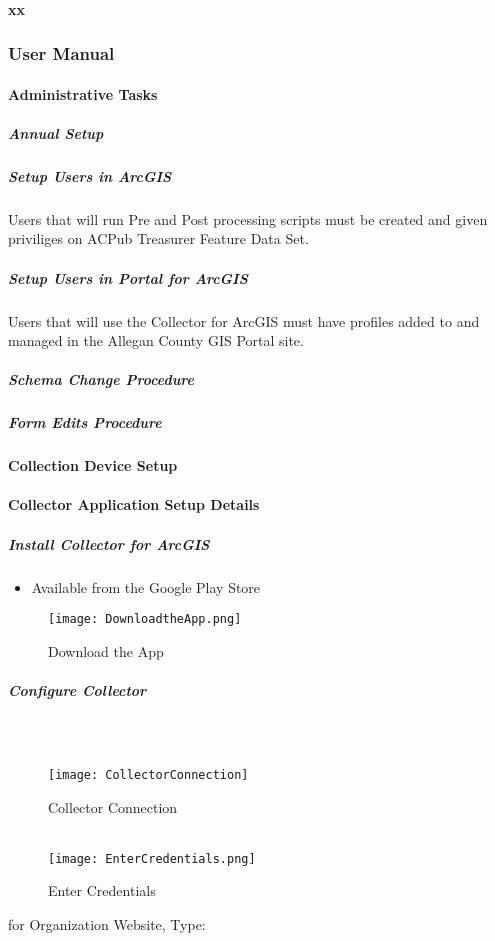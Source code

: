 \documentclass[class=article , crop=false, titlepage, twoside, multi={itemize, figure, verbatim}, float=false]{standalone}
\begin{document}
\paragraph{xx}


\clearpage
\subsubsection{User Manual}

\paragraph{Administrative Tasks}

\subparagraph{Annual Setup}

\subparagraph{Setup Users in ArcGIS}Users that will run Pre and Post processing scripts must be created and given priviliges on ACPub Treasurer Feature Data Set.

\subparagraph{Setup Users in Portal for ArcGIS}Users that will use the Collector for ArcGIS must have profiles added to and managed in the Allegan County GIS Portal site.

\subparagraph{Schema Change Procedure}

\subparagraph{Form Edits Procedure}

\clearpage
\paragraph{Collection Device Setup}

\paragraph{Collector Application Setup Details}

\subparagraph{Install Collector for ArcGIS}
\begin{itemize}
\item Available from the Google Play Store
\end{itemize}
\begin{figure}[h!]
\centering
    \texttt{[image: DownloadtheApp.png]}
\caption{Download the App}
\end{figure}

\clearpage
\subparagraph{Configure Collector}

\subparagraph*{\\}
\begin{wrapfigure}{r}{0.5\textwidth}
\centering
\texttt{[image: CollectorConnection]}
\caption{Collector Connection}
\vspace{.25in}
\HRule \\[.4cm] %
\vspace{.25in}
\texttt{[image: EnterCredentials.png]}
\caption{Enter Credentials}
\end{wrapfigure}
for Organization Website, Type:
\vspace{.5in}
\end{document}
